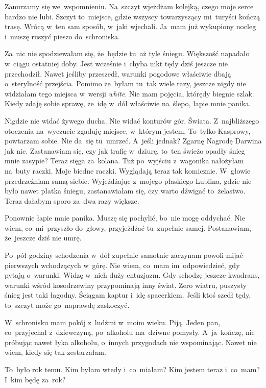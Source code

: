 \documentclass[9pt, a5paper]{memoir}
\begin{document}
Zanurzamy się we~wspomnieniu. Na~szczyt wjeżdżam kolejką, czego moje serce bardzo nie lubi. Szczyt to~miejsce, gdzie wszyscy towarzyszący mi~turyści kończą trasę. Wrócą w~ten sam sposób, w~jaki wjechali. Ja~mam już wykupiony nocleg i~muszę ruszyć pieszo do~schroniska.

Za~nic nie spodziewałam się, że~będzie tu~aż tyle śniegu. Większość napadało w~ciągu ostatniej doby. Jest wcześnie i~chyba nikt tędy dziś jeszcze nie przechodził. Nawet jeśliby przeszedł, warunki pogodowe właściwie dbają o~sterylność przejścia. Pomimo że~byłam tu~tak wiele razy, jeszcze nigdy nie widziałam tego miejsca w~wersji \textit{white}. Nie mam pojęcia, którędy biegnie szlak. Kiedy zdaję sobie sprawę, że~idę w~dół właściwie na~ślepo, łapie mnie panika.

Nigdzie nie widać żywego ducha. Nie widać konturów gór. Świata. Z~najbliższego otoczenia na~wyczucie zgaduję miejsce, w~którym jestem. To~tylko Kasprowy, powtarzam sobie. Nie da~się tu~umrzeć. A~jeśli jednak? Zgarnę Nagrodę Darwina jak nic. Zastanawiam się, czy jak trafię w~dziurę, to~ten świeżo opadły śnieg mnie zasypie? Teraz sięga za~kolana. Tuż po~wyjściu z~wagonika nałożyłam na~buty raczki. Moje biedne raczki. Wyglądają teraz tak komicznie. W~głowie przedrzeźniam samą siebie. Wyjeżdżając z~mojego płaskiego Lublina, gdzie nie było nawet płatka śniegu, zastanawiałam się, czy warto dźwigać to~żelastwo. Teraz dałabym sporo za~dwa razy większe.

Ponownie łapie mnie panika. Muszę się pochylić, bo~nie mogę oddychać. Nie wiem, co~mi~przyszło do~głowy, przyjeżdżać tu~zupełnie samej. Postanawiam, że~jeszcze dziś nie umrę.

Po~pół godziny schodzenia w~dół zupełnie samotnie zaczynam powoli mijać pierwszych wchodzących w~górę. Nie wiem, co~mam im~odpowiedzieć, gdy pytają o~warunki. Widzę w~nich duży entuzjazm. Gdy schodzę jeszcze kwadrans, warunki wśród kosodrzewiny przypominają inny świat. Zero wiatru, puszysty śnieg jest taki łagodny. Ściągam kaptur i~idę spacerkiem. Jeśli ktoś szedł tędy, to~szczyt może go~naprawdę zaskoczyć.

W~schronisku mam pokój z~ludźmi w~moim wieku. Piją. Jeden pan, co~przyjechał z~dziewczyną, po~alkoholu ma~dziwne pomysły. A~ja~kończę, nie próbując nawet łyka alkoholu, o~innych przygodach nie wspominając. Nawet nie wiem, kiedy się tak zestarzałam.

To~było rok temu. Kim byłam wtedy i~co~miałam? Kim jestem teraz i~co~mam? I~kim będę za~rok?
\end{document}
